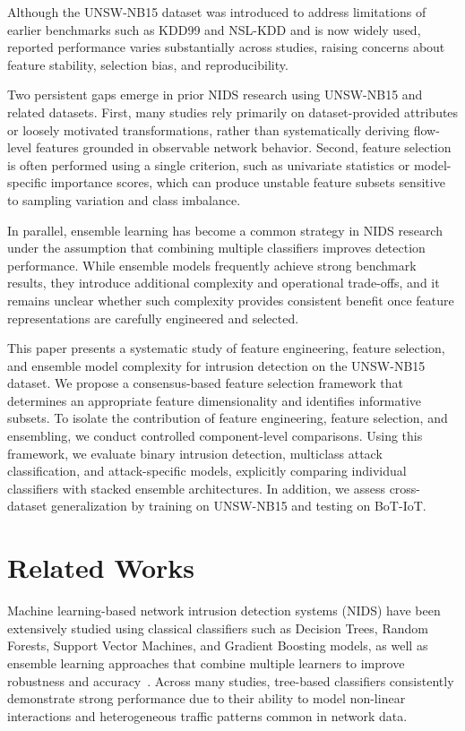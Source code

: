 \documentclass[pdflatex,sn-mathphys-num]{sn-jnl}
\theoremstyle{thmstyleone}%
\theoremstyle{thmstyletwo}%
\theoremstyle{thmstylethree}%
\begin{document}
Although the UNSW-NB15 dataset was introduced to address limitations of earlier benchmarks such as KDD99 and NSL-KDD and is now widely used, reported performance varies substantially across studies, raising concerns about feature stability, selection bias, and reproducibility.

Two persistent gaps emerge in prior NIDS research using UNSW-NB15 and related datasets. First, many studies rely primarily on dataset-provided attributes or loosely motivated transformations, rather than systematically deriving flow-level features grounded in observable network behavior. Second, feature selection is often performed using a single criterion, such as univariate statistics or model-specific importance scores, which can produce unstable feature subsets sensitive to sampling variation and class imbalance.

In parallel, ensemble learning has become a common strategy in NIDS research under the assumption that combining multiple classifiers improves detection performance. While ensemble models frequently achieve strong benchmark results, they introduce additional complexity and operational trade-offs, and it remains unclear whether such complexity provides consistent benefit once feature representations are carefully engineered and selected.

This paper presents a systematic study of feature engineering, feature selection, and ensemble model complexity for intrusion detection on the UNSW-NB15 dataset. We propose a consensus-based feature selection framework that determines an appropriate feature dimensionality and identifies informative subsets. To isolate the contribution of feature engineering, feature selection, and ensembling, we conduct controlled component-level comparisons. Using this framework, we evaluate binary intrusion detection, multiclass attack classification, and attack-specific models, explicitly comparing individual classifiers with stacked ensemble architectures. In addition, we assess cross-dataset generalization by training on UNSW-NB15 and testing on BoT-IoT.

\section{Related Works}\label{Related_Works}
Machine learning-based network intrusion detection systems (NIDS) have been extensively studied using classical classifiers such as Decision Trees, Random Forests, Support Vector Machines, and Gradient Boosting models, as well as ensemble learning approaches that combine multiple learners to improve robustness and accuracy~\cite{Moustafa04042016, Iglesias2015, Mhawi14071461, Amanoul9495897, Tharmini8001537}. Across many studies, tree-based classifiers consistently demonstrate strong performance due to their ability to model non-linear interactions and heterogeneous traffic patterns common in network data.
\end{document}
